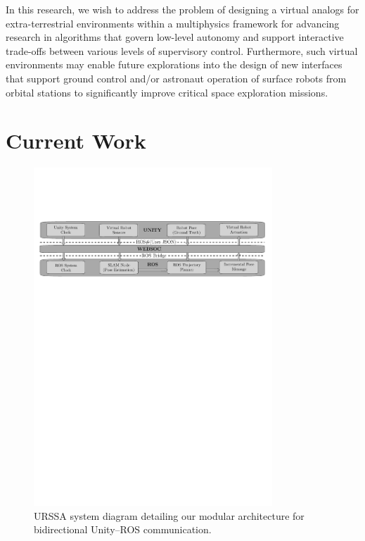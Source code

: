\documentclass[a4paper, 10pt, conference]{ieeeconf}      %
\begin{document}
In this research, we wish to address the problem of designing a virtual analogs for extra-terrestrial environments within a multiphysics framework for advancing research in algorithms that govern low-level autonomy and support interactive trade-offs between various levels of supervisory control. Furthermore, such virtual environments may enable future explorations into the design of new interfaces that support ground control and/or astronaut operation of surface robots from orbital stations to significantly improve critical space exploration missions. 
\section{Current Work}
\begin{figure}[t]
      \centering
        \includegraphics[width=0.8\textwidth]{Figures/Sys_architecture.pdf}
      \caption{URSSA system diagram detailing our modular architecture for bidirectional Unity--ROS communication.}
      \vspace{-1em}
      \label{flowchart}
\end{figure}
\end{document}
